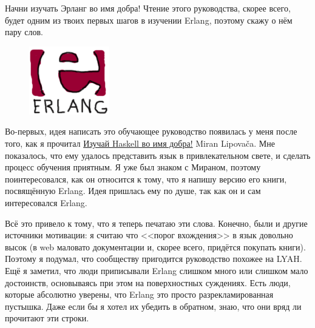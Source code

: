 \documentclass[a4paper,12pt]{report}
\begin{document}
Начни изучать Эрланг во имя добра! Чтение этого руководства, скорее всего, будет одним из твоих первых шагов в изучении Erlang, поэтому скажу о нём пару слов.

\begin{figure}
    \includegraphics[width=1\linewidth]{erlang.png}
\end{figure}

Во\--первых, идея написать это обучающее руководство появилась у меня после того, как я прочитал \href{http://learnyouahaskell.com}{Изучай Haskell во имя добра!} Miran Lipova\v{c}a. Мне показалось, что ему удалось представить язык в привлекательном свете, и сделать процесс обучения приятным. Я уже был знаком с Мираном, поэтому поинтересовался, как он относится к тому, что я напишу версию его книги, посвящённую Erlang. Идея пришлась ему по душе, так как он и сам интересовался Erlang.

Всё это привело к тому, что я теперь печатаю эти слова. Конечно, были и другие источники мотивации: я считаю что <<порог вхождения>> в язык довольно высок (в web маловато документации и, скорее всего, придётся покупать книги). Поэтому я подумал, что сообществу пригодится руководство похожее на LYAH. Ещё я заметил, что люди приписывали Erlang слишком много или слишком мало достоинств, основываясь при этом на поверхностных суждениях. Есть люди, которые абсолютно уверены, что Erlang это просто разрекламированная пустышка. Даже если бы я хотел их убедить в обратном, знаю, что они вряд ли прочитают эти строки.
\end{document}

